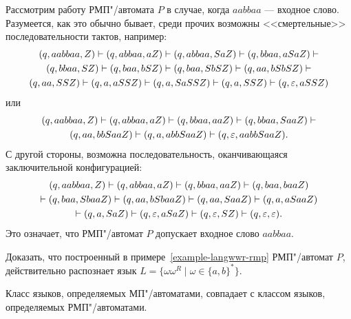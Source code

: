 \begin{myexample}
Рассмотрим работу РМП"/автомата $P$ в случае, когда $aabbaa$ --- входное слово. Разумеется, как это обычно бывает, среди прочих возможны <<смертельные>> последовательности тактов, например:
\begin{multline*}
(q,aabbaa,Z) \vdash (q,abbaa,aZ) \vdash (q,abbaa,SaZ) \vdash (q,bbaa,aSaZ) \vdash \\ (q,bbaa,SZ) \vdash (q,baa,bSZ) \vdash (q,baa,SbSZ) \vdash (q,aa,bSbSZ) \vdash \\ (q,aa,SSZ) \vdash (q,a,aSSZ) \vdash (q,a,SaSSZ) \vdash (q,a,SSZ) \vdash (q,\varepsilon,aSSZ)
\end{multline*}
или
\begin{multline*}
(q,aabbaa,Z) \vdash (q,abbaa,aZ) \vdash (q,bbaa,aaZ) \vdash (q,bbaa,SaaZ) \vdash \\ (q,aa,bbSaaZ) \vdash (q,a,abbSaaZ) \vdash (q,\varepsilon,aabbSaaZ).
\end{multline*}
С другой стороны, возможна последовательность, оканчивающаяся заключительной конфигурацией:
\begin{multline*}
    (q,aabbaa,Z) \vdash
    (q,abbaa,aZ) \vdash
    (q,bbaa,aaZ) \vdash
    (q,baa,baaZ) \\
    \vdash
    (q,baa,SbaaZ) \vdash
    (q,aa,bSbaaZ) \vdash
    (q,aa,SaaZ) \vdash
    (q,a,aSaaZ) \\
    \vdash
    (q,a,SaZ) \vdash
    (q,\varepsilon,aSaZ) \vdash
    (q,\varepsilon,SZ) \vdash
    (q,\varepsilon,\varepsilon).
\end{multline*}
Это означает, что РМП"/автомат $P$ допускает входное слово $aabbaa$.
\end{myexample}

\begin{myproblem}
Доказать, что построенный в примере~\ref{example-langwwr-rmp} РМП"/автомат $P$, действительно распознает язык $L=\{\omega\omega^R\mid\omega\in\{a,b\}^*\}$.
\end{myproblem}

\begin{mytheorem}
\label{theorem-eqMPandRMP}
Класс языков, определяемых МП"/автоматами, совпадает с классом языков, определяемых РМП"/автоматами.
\end{mytheorem}


